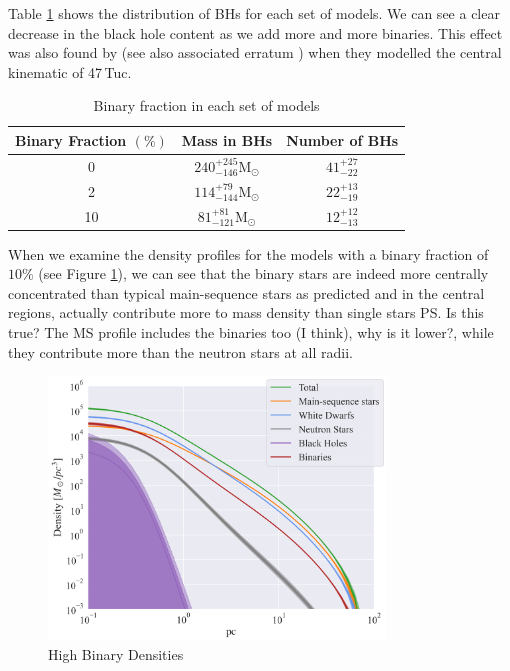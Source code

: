 Table \ref{tab:BH_contents} shows the distribution of BHs for each set of models. We can see a clear
decrease in the black hole content as we add more and more binaries. This effect was also found by
\citet{Mann2019} (see also associated erratum \citealt{Mann2020}) when they modelled the central
kinematic of 47\,Tuc.

\begin{table}

\centering
\caption{Binary fraction in each set of models}
\begin{tabular}{c c c}
	\hline
	Binary Fraction $(\%)$ & Mass in BHs                          & Number of BHs    \\
	\hline
	0                      & $240^{+245}_{-146} \mathrm{M}_\odot$ & $41^{+27}_{-22}$ \\
	2                      & $114^{+79}_{-144} \mathrm{M}_\odot$  & $22^{+13}_{-19}$ \\
	10                     & $81 ^{+81}_{-121} \mathrm{M}_\odot$  & $12^{+12}_{-13}$ \\
	\hline
\end{tabular}
\label{tab:BH_contents}
\end{table}



When we examine the density profiles for the models with a binary fraction of $10\%$ (see Figure
\ref{fig:highbin_model_densities}), we can see that the binary stars are indeed more centrally
concentrated than typical main-sequence stars as predicted and in the central regions, actually
contribute more to mass density than single stars \ps{Is this true? The MS profile includes the
	binaries too (I think), why is it lower?}, while they contribute more than the neutron stars at all
radii.


\begin{figure}
	\centering
	\includegraphics[width=0.8\textwidth]{figures/high_bin_model/density.png}
	\caption{High Binary Densities}
	\label{fig:highbin_model_densities}
\end{figure}



